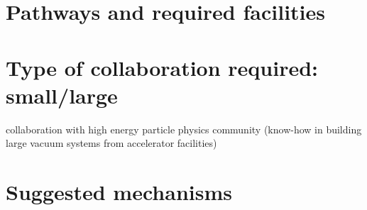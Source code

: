 \section{Pathways and required facilities}
\section{Type of collaboration required:  small/large}
collaboration with high energy particle physics community (know-how in building large vacuum systems from accelerator facilities)

\section{Suggested mechanisms}
